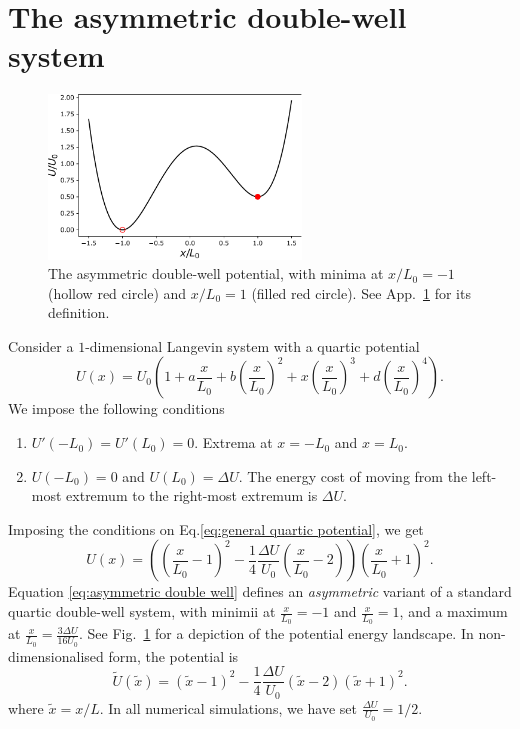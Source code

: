 \documentclass[]{cam-thesis}
\begin{document}
\section{The asymmetric double-well system} \label{app:The asymmetric double-well system}

\begin{figure}[t]
\includegraphics[width=0.6\textwidth]{figs_part1/mcmc/1D_process_potential}
\centering \caption{The asymmetric double-well potential, with minima at $x/L_0 = -1$ (hollow red circle) and $x/L_0=1$ (filled red circle). See App.~\ref{app:The asymmetric double-well system} for its definition.}
\label{fig:1D process potential} 
\end{figure}

Consider a $1$-dimensional Langevin system with a quartic potential
\begin{equation} \label{eq:general quartic potential}
	U(x) = U_0 \left( 1 + a \frac{x}{L_0} + b \left( \frac{x}{L_0} \right)^2 + x \left( \frac{x}{L_0} \right)^3  + d \left( \frac{x}{L_0} \right)^4  \right).
\end{equation}
We impose the following conditions
\begin{enumerate}
\item $U'(-L_0) = U'(L_0) = 0$. Extrema at $x = -L_0$ and $x= L_0$.
\item $U(-L_0) = 0$ and $U(L_0) = \Delta U$. The energy cost of moving from the left-most extremum to the right-most extremum is $\Delta U$.
\end{enumerate}
Imposing the conditions on Eq.\ref{eq:general quartic potential}, we get
\begin{equation}  \label{eq:asymmetric double well}
U(x)= \left( \left(\frac{x}{L_0}-1\right)^{2}-\frac{1}{4}\frac{\Delta U}{U_{0}}\left(\frac{x}{L_0}-2\right)\right)\left(\frac{x}{L_0}+1\right)^{2}. 
\end{equation}
Equation \ref{eq:asymmetric double well} defines an \textit{asymmetric} variant of a standard quartic double-well system, with minimii at $\frac{x}{L_0}= -1$ and $\frac{x}{L_0}=1$, and a maximum at $\frac{x}{L_0} = \frac{ 3 \Delta U}{16 U_0}$. See Fig.~\ref{fig:1D process potential} for a depiction of the potential energy landscape. In non-dimensionalised form, the potential is
\begin{equation}  \label{eq:asymmetric double well nondim}
\tilde{U}(\tilde{x})= \left( \tilde{x}-1\right)^{2} - \frac{1}{4} \frac{\Delta U}{U_{0}} \left( \tilde{x}-2 \right) \left(\tilde{x}+1\right)^{2}. 
\end{equation}
where $\tilde{x} = x / L$. In all numerical simulations, we have set $\frac{\Delta U}{U_{0}}=1/2$.
\end{document}
